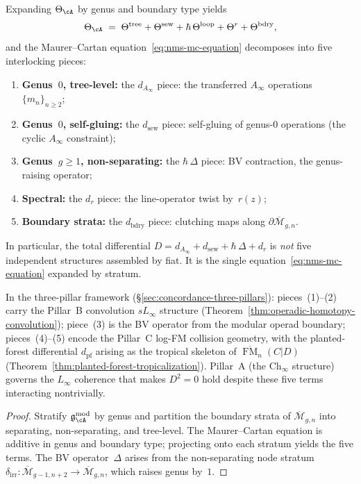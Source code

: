 \begin{proposition}
\label{prop:nms-five-component}%
%
Expanding $\Theta_{\cA}$ by genus and boundary type yields
\[
 \Theta_{\cA}
 \;=\;
 \Theta^{\mathrm{tree}}
 + \Theta^{\mathrm{sew}}
 + \hbar\,\Theta^{\mathrm{loop}}
 + \Theta^{r}
 + \Theta^{\mathrm{bdry}},
\]
and the Maurer--Cartan equation~\eqref{eq:nms-mc-equation} decomposes
into five interlocking pieces:
\begin{enumerate}[label=\textup{(\arabic*)}]
\item \textbf{Genus~$0$, tree-level:}
 the $d_{A_\infty}$ piece: the transferred $A_\infty$ operations
 $\{m_n\}_{n \geq 2}$;
\item \textbf{Genus~$0$, self-gluing:}
 the $d_{\mathrm{sew}}$ piece: self-gluing of genus-$0$ operations
 (the cyclic $A_\infty$ constraint);
\item \textbf{Genus~$g \geq 1$, non-separating:}
 the $\hbar\,\Delta$ piece: BV contraction, the genus-raising
 operator;
\item \textbf{Spectral:}
 the $d_r$ piece: the line-operator twist by~$r(z)$;
\item \textbf{Boundary strata:}
 the $d_{\mathrm{bdry}}$ piece: clutching maps along
 $\partial\overline{\mathcal{M}}_{g,n}$.
\end{enumerate}
In particular, the total differential
$D = d_{A_\infty} + d_{\mathrm{sew}} + \hbar\,\Delta + d_r$
is \emph{not} five independent structures assembled by fiat. It is
the single equation~\eqref{eq:nms-mc-equation} expanded by stratum.

In the three-pillar framework
(\S\ref{sec:concordance-three-pillars}): pieces~(1)--(2) carry the
Pillar~B convolution $sL_\infty$ structure
(Theorem~\ref{thm:operadic-homotopy-convolution}); piece~(3) is the
BV operator from the modular operad boundary; pieces~(4)--(5) encode
the Pillar~C log-FM collision geometry, with the planted-forest
differential $d_{\mathrm{pf}}$ arising as the tropical skeleton of
$\overline{\operatorname{FM}}_n(C|D)$
(Theorem~\ref{thm:planted-forest-tropicalization}). Pillar~A (the
Ch$_\infty$ structure) governs the $L_\infty$ coherence that makes
$D^2 = 0$ hold despite these five terms interacting nontrivially.
\end{proposition}

\begin{proof}
Stratify $\gAmod$ by genus and partition the boundary strata of
$\overline{\mathcal{M}}_{g,n}$ into separating, non-separating, and
tree-level. The Maurer--Cartan equation is additive in genus and
boundary type; projecting onto each stratum yields the five terms.
The BV operator~$\Delta$ arises from the non-separating node
stratum $\delta_{\mathrm{irr}} \colon
\overline{\mathcal{M}}_{g-1,n+2} \to
\overline{\mathcal{M}}_{g,n}$, which raises genus by~$1$.
\end{proof}

